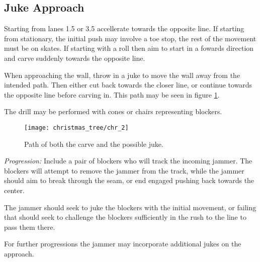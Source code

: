 \subsection*{Juke Approach}
\label{drill:line_to_line_jamming:juke_approach}

Starting from lanes 1.5 or 3.5 accellerate towards the opposite line.
If starting from stationary, the initial push may involve a toe stop, the rest of the movement must be on skates.
If starting with a roll then aim to start in a fowards direction and carve suddenly towards the opposite line.

When approaching the wall, throw in a juke to move the wall away from the intended path.
Then either cut back towards the closer line, or continue towards the opposite line before carving in. 
This path may be seen in figure \ref{fig:chr_1}.

The drill may be performed with cones or chairs representing blockers. 

\begin{figure}[h]
\begin{center}
\texttt{[image: christmas\_tree/chr\_2]}
\caption{Path of both the carve and the possible juke.\label{fig:chr_1}}
\end{center}

\end{figure}


{\it Progression:} Include a pair of blockers who will track the incoming jammer. The blockers will attempt to remove the jammer from the track, while the jammer should aim to break through the seam, or end engaged pushing back towards the center.  

The jammer should seek to juke the blockers with the initial movement, or failing that should seek to challenge the blockers sufficiently in the rush to the line to pass them there.

For further progressions the jammer may incorporate additional jukes on the approach. 
